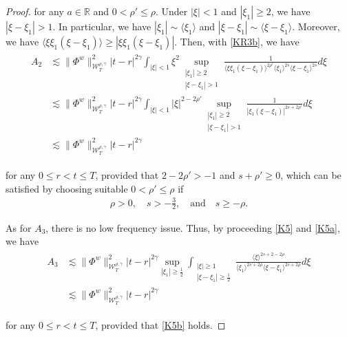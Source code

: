 \documentclass[letterpaper, 11pt,  reqno]{amsart}
\DeclareMathOperator*{\intt}{\int}
\newcommand{\1}{\hspace{0.5mm}\text{I}\hspace{0.5mm}}
\newcommand{\noi}{\noindent}
\newcommand{\R}{\mathbb{R}}
\newcommand{\g}{\gamma}
\newcommand{\les}{\lesssim}
\newcommand{\jb}[1]
{\langle #1 \rangle}
\newcommand{\W}{\mathcal{W}}
\numberwithin{equation}{section}
\numberwithin{theorem}{section}
\begin{document}
\begin{proof}
\noi
 for any $a\in \R$
and 
 $0<\rho'\le\rho$.
Under $|\xi| < 1$ and $|\xi_1|\ge 2$, 
we have $|\xi - \xi_1|> 1$.
In particular, we have $|\xi_1|\sim \jb{\xi_1}$
and $|\xi - \xi_1|\sim \jb{\xi- \xi_1}$.
Moreover, 
we have 
$\jb{\xi\xi_1(\xi-\xi_1)}\ge
 |\xi \xi_1(\xi- \xi_1)|$.
Then, with \eqref{KR3b}, we have
\begin{align}
\begin{split}
A_2
& \les
\|\Phi^w\|_{\W^{\rho,\g}_T}^2
|t-r|^{2\g}
\intt_{|\xi|<1}  \xi^2 
\sup_{\substack{|\xi_1|\ge 2\\|\xi - \xi_1|> 1}}
\frac{1}{\jb {\xi \xi_1 (\xi-\xi_1)}^{2\rho'}\jb {\xi_1}^{2s} \jb {\xi-\xi_1}^{2s}} d\xi
\\
& \les 
\|\Phi^w\|_{\W^{\rho,\g}_T}^2
|t-r|^{2\g}
\intt_{|\xi|<1} |\xi|^{2-2\rho' } 
\sup_{\substack{|\xi_1|\ge 2\\|\xi - \xi_1|> 1}}
\frac{1}{| \xi_1 (\xi-\xi_1)|^{2s+2\rho'} } d\xi\\
& \les 
\|\Phi^w\|_{\W^{\rho,\g}_T}^2
|t-r|^{2\g} 
\end{split}
\label{KR3c}
\end{align}



\noi
for any $0 \le r <  t \le T$, 
provided that $2-2\rho'>-1$ and $ s+\rho' \ge 0$, 
which can be satisfied by choosing 
suitable $0 < \rho' \le \rho$
if 
\begin{align}
\rho > 0, \quad s > -\frac 32,
\quad \text{and} \quad  
s\ge -\rho.
\label{KR3d}
\end{align}






As for $A_3$, 
there is no low frequency issue.
Thus, by 
proceeding \eqref{K5} and \eqref{K5a}, we have
\begin{align}
\begin{aligned}
A_3
& \les
\|\Phi^w\|^2_{\W_T^{\rho,\g}}|t-r |^{2\g}
\sup_{|\xi_1|\ge \frac 12}
\intt_{\substack{|\xi|\ge 1\\|\xi-\xi_1|\ge \frac 12 }}
\frac{ \jb{\xi}^{2s+2-2\rho}}{\jb{\xi_1}^{2s+2\rho}\jb{\xi - \xi_1}^{2s+2\rho}} d\xi\\
& \les
\|\Phi^w\|^2_{\W_T^{\rho,\g}}|t-r |^{2\g}
\end{aligned}
\label{KR4}
\end{align}

\noi
for any $0 \le r <  t \le T$, 
provided that
\eqref{K5b} holds.


\end{proof}
\end{document}
